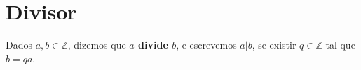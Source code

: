 \section{Divisor}\label{sec:divisor}

Dados $a, b \in \mathbb{Z}$, dizemos que \textbf{$a$ divide $b$}, e escrevemos $a|b$, se existir $q \in \mathbb{Z}$ tal que $b = qa$.